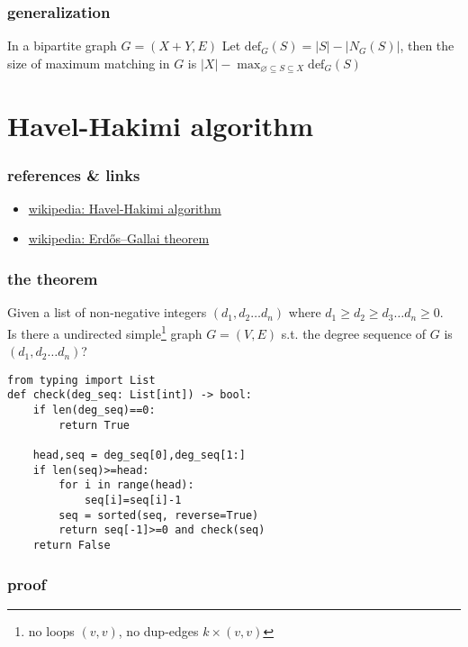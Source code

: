 \documentclass{article}
\begin{document}
\subsubsection{generalization}

In a bipartite graph $G=(X+Y,E)$
Let $\mathrm{def}_G(S)=|S|-|N_G(S)|$,
then the size of maximum matching in $G$ is $|X|-\max_{\varnothing\subseteq S\subseteq X}\mathrm{def}_G(S)$

\newpage
\section{Havel-Hakimi algorithm}

\subsubsection{references \& links}

\begin{itemize}
	\item \href{https://en.wikipedia.org/wiki/Havel-Hakimi_algorithm}{wikipedia: Havel-Hakimi algorithm}
	\item \href{https://en.wikipedia.org/wiki/Erdős–Gallai_theorem}{wikipedia: Erdős–Gallai theorem}
\end{itemize}

\subsubsection{the theorem}

Given a list of non-negative integers $(d_1,d_2\ldots d_n)$ where $d_1\geq d_2\geq d_3\ldots d_n\geq 0$.\\
Is there a undirected simple\footnote{no loops $(v,v)$, no dup-edges $k\times (v,v)$} graph $G=(V,E)$ s.t. the degree sequence of $G$ is $(d_1,d_2\ldots d_n)$?

\begin{verbatim}
from typing import List
def check(deg_seq: List[int]) -> bool:
    if len(deg_seq)==0:
        return True

    head,seq = deg_seq[0],deg_seq[1:]
    if len(seq)>=head:
        for i in range(head):
            seq[i]=seq[i]-1
        seq = sorted(seq, reverse=True)
        return seq[-1]>=0 and check(seq)
    return False
\end{verbatim}

\subsubsection{proof}
\end{document}
